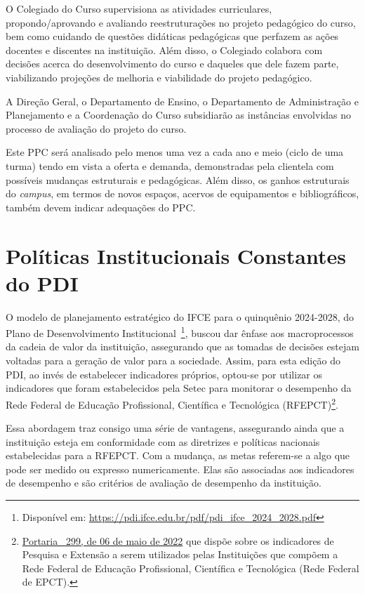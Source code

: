 \documentclass[
	12pt,				%
	openright,			%
	twoside,			%
	a4paper,			%
	chapter=TITLE,		%
	english,			%
	french,				%
	spanish,			%
	brazil,				%
	]{abntex2}
\begin{document}
O Colegiado do Curso supervisiona as atividades curriculares, propondo/aprovando e avaliando reestruturações no projeto pedagógico do curso, bem como cuidando de questões didáticas pedagógicas que perfazem as ações docentes e discentes na instituição. Além disso, o Colegiado colabora com decisões acerca do desenvolvimento do curso e daqueles que dele fazem parte, viabilizando projeções de melhoria e viabilidade do projeto pedagógico.

A Direção Geral, o Departamento de Ensino, o Departamento de Administração e Planejamento e a Coordenação do Curso subsidiarão as instâncias envolvidas no processo de avaliação do projeto do curso.

Este PPC será analisado pelo menos uma vez a cada ano e meio (ciclo de uma turma) tendo em vista a oferta e demanda, 
demonstradas pela clientela com possíveis mudanças estruturais e pedagógicas. Além disso, os ganhos estruturais do \textit{campus}, em termos de novos espaços, acervos de equipamentos e bibliográficos, também devem indicar adequações do PPC.


\chapter{Políticas Institucionais Constantes do PDI}%


O modelo de planejamento estratégico do IFCE para o quinquênio
2024-2028, do Plano de Desenvolvimento Institucional~\footnote{Disponível em:
\url{https://pdi.ifce.edu.br/pdf/pdi_ifce_2024_2028.pdf}}, buscou dar ênfase aos macroprocessos da cadeia de valor da instituição,
assegurando que as tomadas de decisões estejam voltadas para a geração de valor
para a sociedade. Assim, para esta edição do PDI, ao invés de estabelecer indicadores próprios, optou-se
por utilizar os indicadores que foram estabelecidos pela Setec para monitorar o
desempenho da Rede Federal de Educação Profissional, Científica e Tecnológica
(RFEPCT)\footnote{\href{https://www.in.gov.br/en/web/dou/-/portaria-n-299-de-6-de-maio-de-2022-399680297}{Portaria \N~299, de 06 de maio de 2022}
que dispõe sobre os indicadores de Pesquisa e Extensão a serem utilizados pelas
Instituições que compõem a Rede Federal de Educação Profissional, Científica e
Tecnológica (Rede Federal de EPCT).}.


Essa abordagem traz consigo uma série de vantagens, assegurando ainda que a
instituição esteja em conformidade com as diretrizes e políticas nacionais
estabelecidas para a RFEPCT. Com a mudança, as metas  referem-se a algo que pode ser medido ou expresso numericamente. Elas são
associadas aos indicadores de desempenho e são critérios de avaliação de desempenho da instituição.
\end{document}
